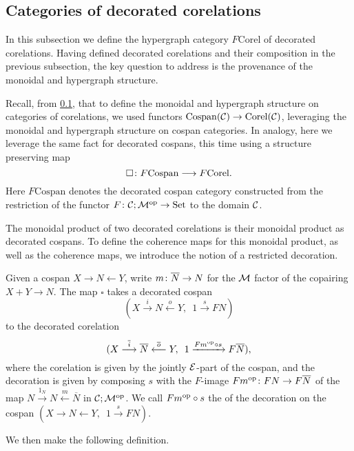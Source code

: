 \subsection{Categories of decorated corelations} \label{ssec.deccorelcats}

In this subsection we define the hypergraph category $F\mathrm{Corel}$ of
decorated corelations. Having defined decorated corelations and their
composition in the previous subsection, the key question to address is the
provenance of the monoidal and hypergraph structure. 

Recall, from \ref{ssec.deccorelcats}, that to define the monoidal and hypergraph
structure on categories of corelations, we used functors $\mathrm{Cospan}(\mathcal C)
\to \mathrm{Corel}(\mathcal C)$, leveraging the monoidal and hypergraph structure on
cospan categories. In analogy, here we leverage the same fact for decorated
cospans, this time using a structure preserving map 
\[
  \square{\colon} F\mathrm{Cospan} \longrightarrow F\mathrm{Corel}.
\]
Here $F\mathrm{Cospan}$ denotes the decorated cospan category constructed from
the restriction of the functor $F{\colon} \mathcal C;\mathcal M^{\mathrm{op}} \to \mathrm{Set}$ to the domain
$\mathcal C$. 

The monoidal product of two decorated corelations is their monoidal product as
decorated cospans. To define the coherence maps for this monoidal product, as
well as the coherence maps, we introduce the notion of a restricted decoration.

Given a cospan $X \to N \leftarrow Y$, write $m{\colon} \overline{N} \to N$ for the
$\mathcal M$ factor of the copairing $X+Y \to N$. The map $\square$ takes a
decorated cospan 
\[
  (X \stackrel{i}\longrightarrow N \stackrel{o}\longleftarrow Y, \enspace 1
    \stackrel{s}\longrightarrow FN)
\]
to the decorated corelation 
\[
  (X \stackrel{\overline{i}}\longrightarrow \overline N
  \stackrel{\overline{o}}{\longleftarrow} Y, \enspace 1 \xrightarrow{Fm^{\mathrm{op}} \circ
  s} F\overline{N}),
\]
where the corelation is given by the jointly $\mathcal E$-part of the cospan, and the
decoration is given by composing $s$ with the $F$-image $Fm^{\mathrm{op}}{\colon} FN \to
F\overline{N}$ of the map $N \stackrel{1_N}\to N \stackrel{m}\leftarrow
\overline{N}$ in $\mathcal C;\mathcal M^{\mathrm{op}}$. We call $Fm^{\mathrm{op}} \circ s$ the
 of the decoration on the cospan $(X \to N
\leftarrow Y, \enspace 1 \stackrel{s}\to FN)$.

We then make the following definition.


